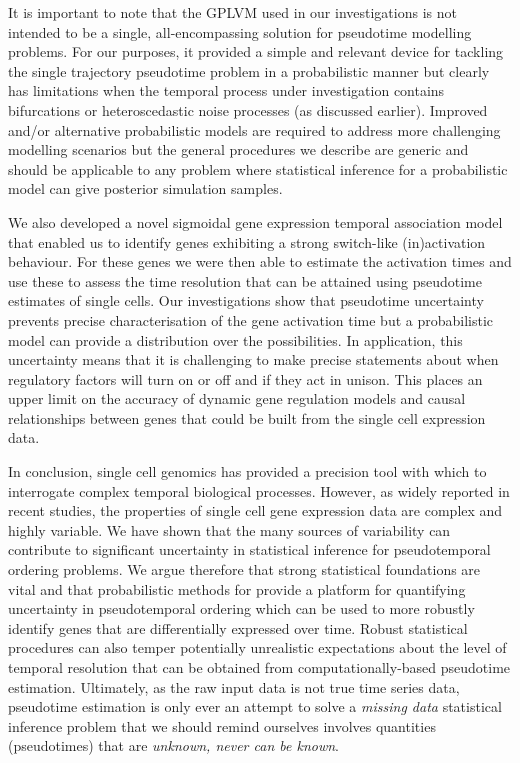 It is important to note that the GPLVM used in our investigations is not intended to be a single, all-encompassing solution for pseudotime modelling problems. For our purposes, it provided a simple and relevant device for tackling the single trajectory pseudotime problem in a probabilistic manner but clearly has limitations when the temporal process under investigation contains bifurcations or heteroscedastic noise processes (as discussed earlier). Improved and/or alternative probabilistic models are required to address more challenging modelling scenarios but the general procedures we describe are generic and should be applicable to any problem where statistical inference for a probabilistic model can give posterior simulation samples.

We also developed a novel sigmoidal gene expression temporal association model that enabled us to identify genes exhibiting a strong switch-like (in)activation behaviour. For these genes we were then able to estimate the activation times and use these to assess the time resolution that can be attained using pseudotime estimates of single cells. Our investigations show that pseudotime uncertainty prevents precise characterisation of the gene activation time but a probabilistic model can provide a distribution over the possibilities. In application, this uncertainty means that it is challenging to make precise statements about when regulatory factors will turn on or off and if they act in unison. This places an upper limit on the accuracy of dynamic gene regulation models and causal relationships between genes that could be built from the single cell expression data.

In conclusion, single cell genomics has provided a precision tool with which to interrogate complex temporal biological processes. However, as widely reported in recent studies, the properties of single cell gene expression data are complex and highly variable. We have shown that the many sources of  variability can contribute to significant uncertainty in statistical inference for pseudotemporal ordering problems. We argue therefore that strong statistical foundations are vital and that probabilistic methods for provide a platform for quantifying uncertainty in pseudotemporal ordering which can be used to more robustly identify genes that are differentially expressed over time. Robust statistical procedures can also temper potentially unrealistic expectations about the level of temporal resolution that can be obtained from computationally-based pseudotime estimation. Ultimately, as the raw input data is not true time series data, pseudotime estimation is only ever an attempt to solve a \emph{missing data} statistical inference problem that we should remind ourselves involves quantities (pseudotimes) that are \emph{unknown, never can be known}.

